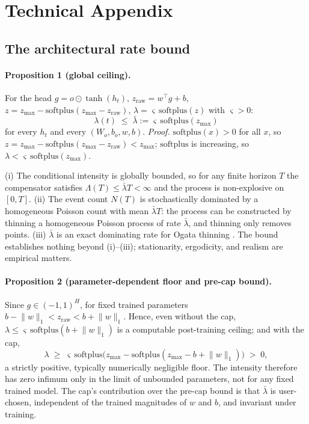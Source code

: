 \section{Technical Appendix}
\label{sec:appendix}

\subsection{The architectural rate bound}
\paragraph{Proposition 1 (global ceiling).}
For the head $g=o\odot\tanh(h_t)$, $z_{\mathrm{raw}}=w^{\!\top}g+b$,
$z=z_{\max}-\mathrm{softplus}(z_{\max}-z_{\mathrm{raw}})$,
$\lambda=\varsigma\,\mathrm{softplus}(z)$ with $\varsigma>0$:
\[
\lambda(t)\;\le\;\bar\lambda:=\varsigma\,\mathrm{softplus}(z_{\max})
\]
for every $h_t$ and every $(W_o,b_o,w,b)$.
\emph{Proof.} $\mathrm{softplus}(x)>0$ for all $x$, so
$z=z_{\max}-\mathrm{softplus}(z_{\max}-z_{\mathrm{raw}})<z_{\max}$;
$\mathrm{softplus}$ is increasing, so
$\lambda<\varsigma\,\mathrm{softplus}(z_{\max})$. 

(i) The conditional intensity is globally bounded,
so for any finite horizon $T$ the compensator satisfies
$\Lambda(T)\le\bar\lambda T<\infty$ and the process is non-explosive on
$[0,T]$. (ii) The event count $N(T)$ is stochastically dominated by a
homogeneous Poisson count with mean $\bar\lambda T$: the process can be
constructed by thinning a homogeneous Poisson process of rate $\bar\lambda$,
and thinning only removes points. (iii) $\bar\lambda$ is an exact dominating
rate for Ogata thinning \citep{lewis1979thinning,ogata1981lewis}. The bound
establishes nothing beyond (i)--(iii); stationarity, ergodicity, and
realism are empirical matters.

\paragraph{Proposition 2 (parameter-dependent floor and pre-cap bound).}
Since $g\in(-1,1)^H$, for fixed trained parameters
$b-\lVert w\rVert_1<z_{\mathrm{raw}}<b+\lVert w\rVert_1$. Hence, even
without the cap, $\lambda\le\varsigma\,\mathrm{softplus}(b+\lVert
w\rVert_1)$ is a computable post-training ceiling; and with the cap,
\[
\lambda\;\ge\;\varsigma\,\mathrm{softplus}\bigl(z_{\max}
-\mathrm{softplus}(z_{\max}-b+\lVert w\rVert_1)\bigr)\;>\;0,
\]
a strictly positive, typically numerically negligible floor. The intensity
therefore has zero infimum only in the limit of unbounded parameters, not
for any fixed trained model. The cap's contribution over the pre-cap bound
is that $\bar\lambda$ is user-chosen, independent of the trained magnitudes
of $w$ and $b$, and invariant under training.

